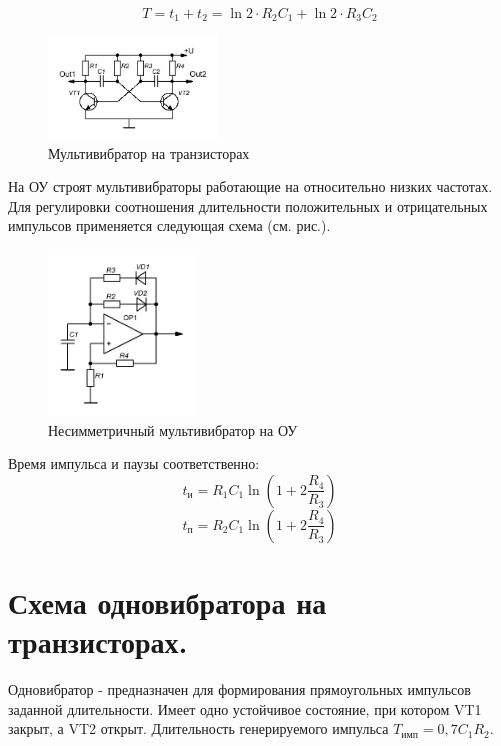 \documentclass[unicode, 12pt, a4paper, oneside]{article}
\begin{document}
\begin{displaymath}
T = t_1 + t_2 = \ln 2 \cdot R_2 C_1 + \ln 2 \cdot R_3 C_2
\end{displaymath}
\begin{figure}[H]
\centering
\includegraphics[width=0.4\textwidth]{141_tranz.jpg}
\caption{Мультивибратор на транзисторах}
\end{figure}
На ОУ строят мультивибраторы работающие на относительно низких частотах. Для регулировки соотношения длительности положительных и отрицательных импульсов применяется следующая схема (см. рис.).
\begin{figure}[H]
\centering
\includegraphics[width=0.35\textwidth]{141_OU_unsim.jpg}
\caption{Несимметричный мультивибратор на ОУ}
\end{figure}

Время импульса и паузы соответственно:
\begin{displaymath}
t_\text{и} = R_1 C_1 \ln (1 + 2 \frac{R_4}{R_3} )
\end{displaymath}
\begin{displaymath}
t_\text{п} = R_2 C_1 \ln (1 + 2 \frac{R_4}{R_3} )
\end{displaymath}
\section{Схема одновибратора на транзисторах.}

Одновибратор - предназначен для формирования прямоугольных импульсов заданной длительности. Имеет одно устойчивое состояние, при котором VT1 закрыт, а VT2 открыт. Длительность генерируемого импульса $T_\text{имп} = 0,7 C_1 R_2 $.
\end{document}
